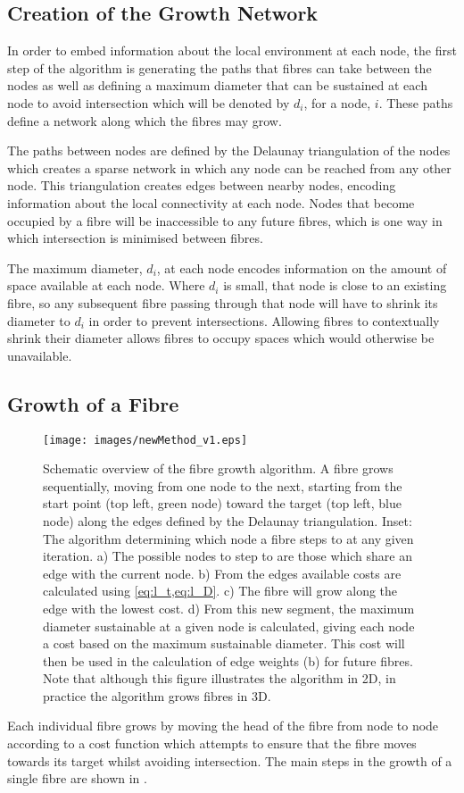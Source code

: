 \subsection{Creation of the Growth Network}
\label{sec:creation_of_the_growth_network}
In order to embed information about the local environment at each node, the first step of the algorithm is generating the paths that fibres can take between the nodes as well as defining a maximum diameter that can be sustained at each node to avoid intersection which will be denoted by $d_i$, for a node, $i$. These paths define a network along which the fibres may grow.

The paths between nodes are defined by the Delaunay triangulation\cite{Delaunay1934} of the nodes which creates a sparse network in which any node can be reached from any other node.
This triangulation creates edges between nearby nodes, encoding information about the local connectivity at each node.
Nodes that become occupied by a fibre will be inaccessible to any future fibres, which is one way in which intersection is minimised between fibres.

The maximum diameter, $d_i$, at each node encodes information on the amount of space available at each node.
Where $d_i$ is small, that node is close to an existing fibre, so any subsequent fibre passing through that node will have to shrink its diameter to $d_i$ in order to prevent intersections.
Allowing fibres to contextually shrink their diameter allows fibres to occupy spaces which would otherwise be unavailable.

\subsection{Growth of a Fibre}
\label{sec:growth_of_a_fibre}
\begin{figure}
	\centering
	\texttt{[image: images/newMethod\_v1.eps]}
	\caption{\small Schematic overview of the fibre growth algorithm. A fibre grows sequentially, moving from one node to the next, starting from the start point (top left, green node) toward the target (top left, blue node) along the edges defined by the Delaunay triangulation. Inset: The algorithm determining which node a fibre steps to at any given iteration. a) The possible nodes to step to are those which share an edge with the current node. b) From the edges available costs are calculated using \cref{eq:l_t,eq:l_D}. c) The fibre will grow along the edge with the lowest cost. d) From this new segment, the maximum diameter sustainable at a given node is calculated, giving each node a cost based on the maximum sustainable diameter. This cost will then be used in the calculation of edge weights (b) for future fibres. Note that although this figure illustrates the algorithm in 2D, in practice the algorithm grows fibres in 3D.}
	\label{fig:method}
\end{figure}
Each individual  fibre grows by moving the head of the fibre from node to node according to a cost function which attempts to ensure that the fibre moves towards its target whilst avoiding intersection.
The main steps in the growth of a single fibre are shown in .

